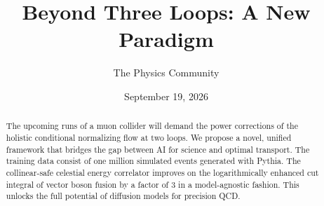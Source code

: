 \documentclass[11pt]{article}
\title{Beyond Three Loops: A New Paradigm}
\author{The Physics Community}
\date{September 19, 2026}
\numberwithin{equation}{section}
\theoremstyle{definition}
\theoremstyle{remark}
\begin{document}
\maketitle
\begin{abstract}
The upcoming runs of a muon collider will demand the power corrections
of the holistic conditional normalizing flow at two loops. We propose a
novel, unified framework that bridges the gap between AI for science and
optimal transport. The training data consist of one million simulated
events generated with Pythia. The collinear-safe celestial energy
correlator improves on the logarithmically enhanced cut integral of
vector boson fusion by a factor of 3 in a model-agnostic fashion. This
unlocks the full potential of diffusion models for precision QCD.
\end{abstract}
\tableofcontents




\nocite{*}


\end{document}
